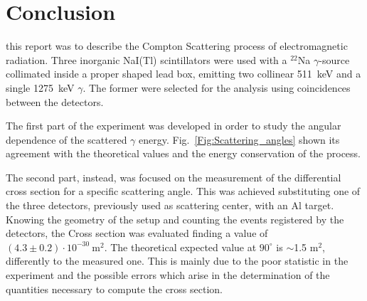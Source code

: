 
\section*{Conclusion}
this report was to describe the Compton Scattering process of electromagnetic radiation. Three inorganic NaI(Tl) scintillators were used with a $^{22}$Na $\gamma$-source collimated inside a proper shaped lead box,  emitting two collinear 511~keV  and a single 1275~keV $\gamma$. The former were selected for the analysis using coincidences between the detectors.

The first part of the experiment  was developed in order to study the angular dependence of the scattered $\gamma$ energy. Fig.~\ref{Fig:Scattering_angles} shown its agreement with the theoretical values and the energy conservation of the process.

The second part, instead, was focused on the measurement of the differential cross section for a specific scattering angle. This was achieved substituting one of the three detectors, previously used as scattering center, with an Al target. Knowing the geometry of the setup and counting the events registered by the detectors, the Cross section was evaluated finding a value of $(4.3\pm0.2)\cdot 10^{-30}\ \text{m}^{2}$.  The theoretical expected value at $90^\circ$ is $\sim$1.5 m$^2$, differently to the measured one. This is mainly due to the poor statistic in the experiment and the possible errors which arise in the determination of the quantities necessary to compute the cross section.
